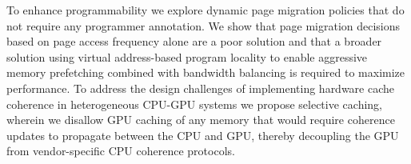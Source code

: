 To enhance programmability we explore dynamic page migration policies that do
not require any programmer annotation.
We show that page migration decisions based on page access frequency
alone are a poor solution and that a broader solution using virtual
address-based program locality to enable aggressive memory prefetching combined
with bandwidth balancing is required to
maximize performance.
%
To address the design challenges of implementing hardware cache
coherence in heterogeneous CPU-GPU systems 
we propose selective caching, wherein we disallow GPU caching of any memory that
would require coherence updates to propagate between the CPU and GPU, thereby
decoupling the GPU from vendor-specific CPU coherence protocols.


